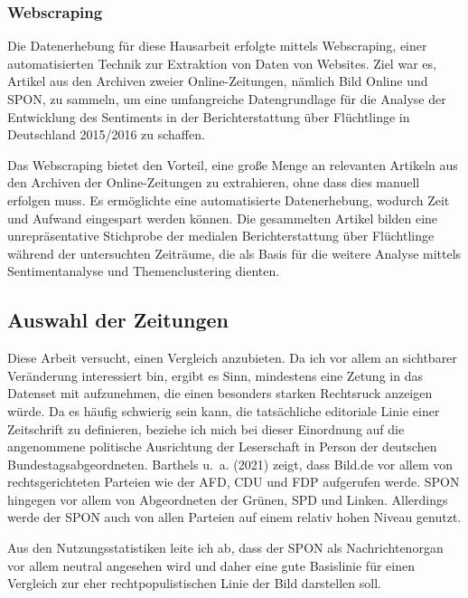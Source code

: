 \documentclass[
  11pt,
]{article}
\begin{document}
\hypertarget{webscraping}{%
\subsubsection{\texorpdfstring{\textbf{Webscraping}}{Webscraping}}\label{webscraping}}

Die Datenerhebung für diese Hausarbeit erfolgte mittels Webscraping,
einer automatisierten Technik zur Extraktion von Daten von Websites.
Ziel war es, Artikel aus den Archiven zweier Online-Zeitungen, nämlich
Bild Online und SPON, zu sammeln, um eine umfangreiche Datengrundlage
für die Analyse der Entwicklung des Sentiments in der Berichterstattung
über Flüchtlinge in Deutschland 2015/2016 zu schaffen.

Das Webscraping bietet den Vorteil, eine große Menge an relevanten
Artikeln aus den Archiven der Online-Zeitungen zu extrahieren, ohne dass
dies manuell erfolgen muss. Es ermöglichte eine automatisierte
Datenerhebung, wodurch Zeit und Aufwand eingespart werden können. Die
gesammelten Artikel bilden eine unrepräsentative Stichprobe der medialen
Berichterstattung über Flüchtlinge während der untersuchten Zeiträume,
die als Basis für die weitere Analyse mittels Sentimentanalyse und
Themenclustering dienten.

\hypertarget{auswahl-der-zeitungen}{%
\subsection{Auswahl der Zeitungen}\label{auswahl-der-zeitungen}}

Diese Arbeit versucht, einen Vergleich anzubieten. Da ich vor allem an
sichtbarer Veränderung interessiert bin, ergibt es Sinn, mindestens eine
Zetung in das Datenset mit aufzunehmen, die einen besonders starken
Rechtsruck anzeigen würde. Da es häufig schwierig sein kann, die
tatsächliche editoriale Linie einer Zeitschrift zu definieren, beziehe
ich mich bei dieser Einordnung auf die angenommene politische
Ausrichtung der Leserschaft in Person der deutschen
Bundestagsabgeordneten. Barthels u.~a. (2021) zeigt, dass Bild.de vor
allem von rechtsgerichteten Parteien wie der AFD, CDU und FDP aufgerufen
werde. SPON hingegen vor allem von Abgeordneten der Grünen, SPD und
Linken. Allerdings werde der SPON auch von allen Parteien auf einem
relativ hohen Niveau genutzt.

Aus den Nutzungsstatistiken leite ich ab, dass der SPON als
Nachrichtenorgan vor allem neutral angesehen wird und daher eine gute
Basislinie für einen Vergleich zur eher rechtpopulistischen Linie der
Bild darstellen soll.
\end{document}
